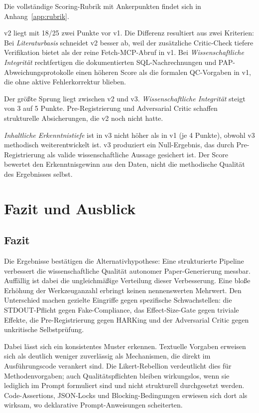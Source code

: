 \documentclass[11pt,a4paper]{article}
\begin{document}
Die vollständige Scoring-Rubrik mit Ankerpunkten findet sich in
Anhang~\ref{app:rubrik}.

v2 liegt mit 18/25 zwei Punkte vor v1. Die Differenz resultiert aus zwei Kriterien: Bei
\emph{Literaturbasis} schneidet v2 besser ab, weil der zusätzliche Critic-Check
tiefere Verifikation bietet als der reine Fetch-MCP-Abruf in v1. Bei
\emph{Wissenschaftliche Integrität} rechtfertigen die dokumentierten
SQL-Nachrechnungen und PAP-Abweichungsprotokolle einen höheren Score als die
formalen QC-Vorgaben in v1, die ohne aktive Fehlerkorrektur blieben.

Der größte Sprung liegt zwischen v2 und v3. \emph{Wissenschaftliche Integrität}
steigt von 3 auf 5 Punkte.
Pre-Registrierung und Adversarial Critic schaffen strukturelle Absicherungen,
die v2 noch nicht hatte.

\emph{Inhaltliche Erkenntnistiefe} ist in v3 nicht höher als in v1 (je 4 Punkte),
obwohl v3 methodisch weiterentwickelt ist. v3 produziert ein Null-Ergebnis, das
durch Pre-Registrierung als valide wissenschaftliche Aussage gesichert ist. Der
Score bewertet den Erkenntnisgewinn aus den Daten, nicht die methodische Qualität
des Ergebnisses selbst.

\section{Fazit und Ausblick}

\subsection{Fazit}

Die Ergebnisse bestätigen die Alternativhypothese: Eine strukturierte Pipeline
verbessert die wissenschaftliche Qualität autonomer Paper-Generierung messbar.
Auffällig ist dabei die ungleichmäßige Verteilung dieser Verbesserung. Eine
bloße Erhöhung der Werkzeuganzahl erbringt keinen nennenswerten Mehrwert. Den
Unterschied machen gezielte Eingriffe gegen spezifische Schwachstellen: die
STDOUT-Pflicht gegen Fake-Compliance, das Effect-Size-Gate gegen triviale Effekte,
die Pre-Registrierung gegen HARKing und der Adversarial Critic gegen unkritische
Selbstprüfung.

Dabei lässt sich ein konsistentes Muster erkennen. Textuelle Vorgaben erweisen sich
als deutlich weniger zuverlässig als Mechanismen, die direkt im Ausführungscode
verankert sind. Die Likert-Rebellion verdeutlicht dies für Methodenvorgaben; auch
Qualitätspflichten bleiben wirkungslos, wenn sie lediglich im Prompt formuliert sind
und nicht strukturell durchgesetzt werden. Code-Assertions, JSON-Locks und
Blocking-Bedingungen erwiesen sich dort als wirksam, wo deklarative
Prompt-Anweisungen scheiterten.
\end{document}

